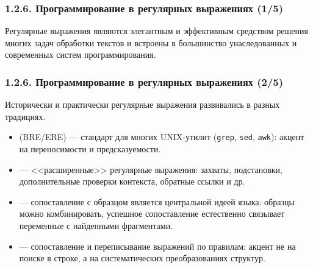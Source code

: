 \begin{frame}
\frametitle{1.2.6. Программирование в регулярных выражениях (1/5)}




Регулярные выражения являются элегантным и эффективным средством
решения многих задач обработки текстов и встроены в большинство
унаследованных и современных систем программирования.
\end{frame}


\begin{frame}
\frametitle{1.2.6. Программирование в регулярных выражениях (2/5)}
Исторически и практически регулярные выражения развивались в разных традициях.

\smallskip
\begin{itemize}
\item {} (BRE/ERE) --- стандарт для многих UNIX-утилит
(\texttt{grep}, \texttt{sed}, \texttt{awk}):
акцент на переносимости и предсказуемости.

\smallskip
\item {} --- <<расширенные>> регулярные выражения: захваты, подстановки, дополнительные проверки контекста, обратные ссылки и др.

\smallskip
\item {} --- сопоставление с образцом является центральной
идеей языка: образцы можно комбинировать, успешное сопоставление
естественно связывает переменные с найденными фрагментами.

\smallskip
\item {} --- сопоставление и переписывание выражений по правилам: акцент не на поиске в строке, а на систематических преобразованиях структур.
\end{itemize}
\end{frame}



